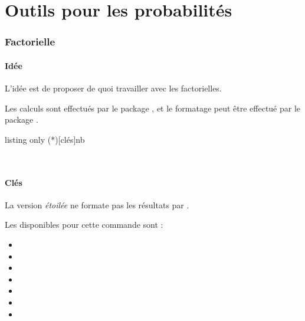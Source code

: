 \part{Outils pour les probabilités}

\section{Factorielle}\label{factoriel}

\subsection{Idée}

\begin{tipblock}
 L'idée est de proposer de quoi travailler avec les factorielles.

Les calculs sont effectués par le package , et le formatage peut être effectué par le package .
\end{tipblock}

\begin{PresCodeTexPL}{listing only}
\Factorielle(*)[clés]{nb}
\end{PresCodeTexPL}

\begin{PresCodePL}{}
\\
\end{PresCodePL}

\subsection{Clés}

\begin{cautionblock}
La version \textit{étoilée} ne formate pas les résultats par .

\smallskip

Les  disponibles pour cette commande sont :

\begin{itemize}
	\item {}
	\item {}
	\item {}
	\item {}
	\item {}
	\item {}
	\item {}
\end{itemize}
\vspace*{-\baselineskip}\leavevmode
\end{cautionblock}

